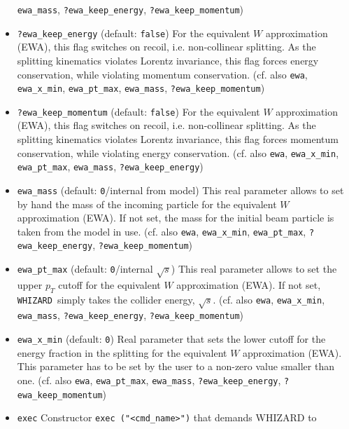 \documentclass[12pt]{book}
\newcommand{\ttt}[1]{\texttt{#1}}
\newcommand{\whizard}{\texttt{WHIZARD}}
\begin{document}
\begin{itemize}
\ttt{ewa\_mass}, \ttt{?ewa\_keep\_energy}, 
\ttt{?ewa\_keep\_momentum}) 
\item
\ttt{?ewa\_keep\_energy} \qquad (default: \ttt{false}) \newline
For the equivalent $W$ approximation (EWA), this flag switches on
recoil, i.e. non-collinear splitting. As the splitting kinematics
violates Lorentz invariance, this flag forces energy conservation,
while violating momentum conservation. (cf. also \ttt{ewa},
\ttt{ewa\_x\_min}, \ttt{ewa\_pt\_max},  \ttt{ewa\_mass},
\ttt{?ewa\_keep\_momentum}) 
\item
\ttt{?ewa\_keep\_momentum} \qquad (default: \ttt{false}) \newline
For the equivalent $W$ approximation (EWA), this flag switches on
recoil, i.e. non-collinear splitting. As the splitting kinematics
violates Lorentz invariance, this flag forces momentum conservation,
while violating energy conservation. (cf. also \ttt{ewa},
\ttt{ewa\_x\_min}, \ttt{ewa\_pt\_max},  \ttt{ewa\_mass},
\ttt{?ewa\_keep\_energy}) 
\item
\ttt{ewa\_mass} \qquad (default: \ttt{0}/internal from model) \newline 
This real parameter allows to set by hand the mass of the incoming
particle for the equivalent $W$ approximation (EWA). If not
set, the mass for the initial beam particle is taken from the model in
use. (cf. also \ttt{ewa}, \ttt{ewa\_x\_min}, \ttt{ewa\_pt\_max}, 
\ttt{?ewa\_keep\_energy}, \ttt{?ewa\_keep\_momentum}) 
\item
\ttt{ewa\_pt\_max} \qquad (default: \ttt{0}/internal $\sqrt{s}$)
\newline
This real parameter allows to set the upper $p_T$ cutoff for the
equivalent $W$ approximation (EWA). If not set, \whizard\ simply
takes the collider energy, $\sqrt{s}$. (cf. also \ttt{ewa},
\ttt{ewa\_x\_min}, \ttt{ewa\_mass}, \ttt{?ewa\_keep\_energy},
\ttt{?ewa\_keep\_momentum})  
\item
\ttt{ewa\_x\_min} \qquad (default: \ttt{0}) \newline
Real parameter that sets the lower cutoff for the energy fraction in
the splitting for the equivalent $W$ approximation (EWA). This
parameter has to be set by the user to a non-zero value smaller than
one. (cf. also \ttt{ewa}, \ttt{ewa\_pt\_max}, \ttt{ewa\_mass},
\ttt{?ewa\_keep\_energy}, \ttt{?ewa\_keep\_momentum}) 
\item
\ttt{exec} \newline
Constructor \ttt{exec ("<cmd\_name>")} that demands WHIZARD to

\end{itemize}
\end{document}

